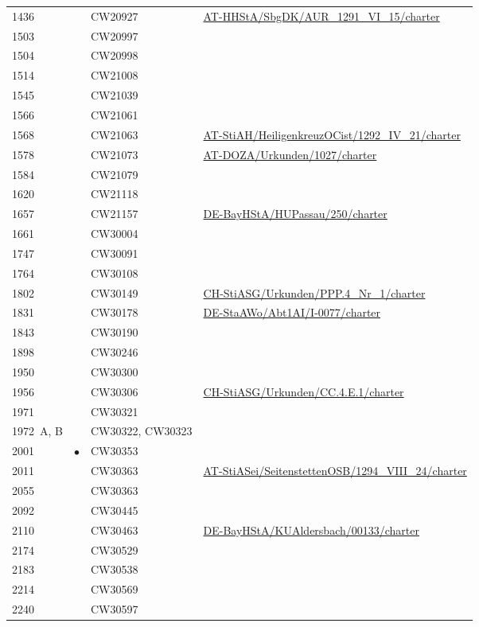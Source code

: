 \begin{xltabular}{\linewidth}{@{} l c l X @{}}
1436	&           & CW20927
		& \url{AT-HHStA/SbgDK/AUR_1291_VI_15/charter}
	\\
1503	&           & CW20997 \\
1504	&           & CW20998 \\
1514	&           & CW21008 \\
1545	&           & CW21039 \\
1566	&           & CW21061 \\
1568	&           & CW21063
		& \url{AT-StiAH/HeiligenkreuzOCist/1292_IV_21/charter}
	\\
1578	&           & CW21073
		& \url{AT-DOZA/Urkunden/1027/charter}
	\\
1584	&           & CW21079 \\
1620	&           & CW21118 \\
1657	&           & CW21157
		& \url{DE-BayHStA/HUPassau/250/charter}
	\\
1661	&           & CW30004 \\
1747	&           & CW30091 \\
1764	&           & CW30108 \\
1802	&           & CW30149
		& \url{CH-StiASG/Urkunden/PPP.4_Nr_1/charter}
	\\
1831	&           & CW30178
		& \url{DE-StaAWo/Abt1AI/I-0077/charter}
	\\
1843	&           & CW30190 \\
1898	&           & CW30246 \\
1950	&           & CW30300 \\
1956	&           & CW30306
		& \url{CH-StiASG/Urkunden/CC.4.E.1/charter}
	\\
1971	&           & CW30321 \\
1972~A, B	&           & CW30322, CW30323 \\
2001	& $\bullet$ & CW30353 \\
2011	&           & CW30363
		& \url{AT-StiASei/SeitenstettenOSB/1294_VIII_24/charter}
	\\
2055	&           & CW30363 \\
2092	&           & CW30445 \\
2110	&           & CW30463
		& \url{DE-BayHStA/KUAldersbach/00133/charter}
	\\
2174	&           & CW30529 \\
2183	&           & CW30538 \\
2214	&           & CW30569 \\
2240	&           & CW30597 \\

\end{xltabular}
